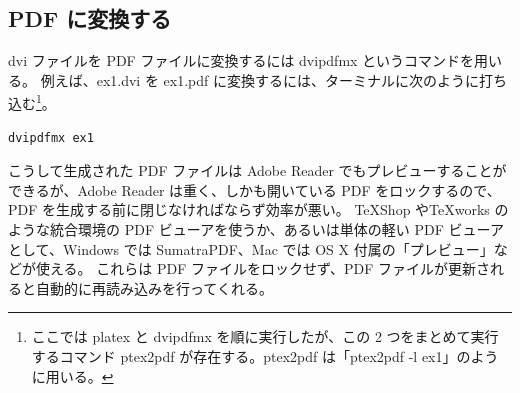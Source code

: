 \subsection{PDF に変換する}
dvi ファイルを PDF ファイルに変換するには dvipdfmx というコマンドを用いる。
例えば、ex1.dvi を ex1.pdf に変換するには、ターミナルに次のように打ち込む\footnote{ここでは platex と dvipdfmx を順に実行したが、この 2 つをまとめて実行するコマンド ptex2pdf が存在する。ptex2pdf は「ptex2pdf -l ex1」のように用いる。}。
\begin{mdframed}[roundcorner=0.50zw,leftmargin=3.00zw,rightmargin=3.00zw,skipabove=0.40zw,skipbelow=0.40zw,innertopmargin=4.00pt,innerbottommargin=4.00pt,innerleftmargin=5.00pt,innerrightmargin=5.00pt,linecolor=gray!090,linewidth=0.50pt,backgroundcolor=gray!90]\color{gray!10}
\begin{verbatim}
dvipdfmx ex1
\end{verbatim}
\end{mdframed}
こうして生成された PDF ファイルは Adobe Reader でもプレビューすることができるが、Adobe Reader は重く、しかも開いている PDF をロックするので、PDF を生成する前に閉じなければならず効率が悪い。
\TeX{}Shop や\TeX{}works のような統合環境の PDF ビューアを使うか、あるいは単体の軽い PDF ビューアとして、Windows では SumatraPDF、Mac では OS X 付属の「プレビュー」などが使える。
これらは PDF ファイルをロックせず、PDF ファイルが更新されると自動的に再読み込みを行ってくれる。
